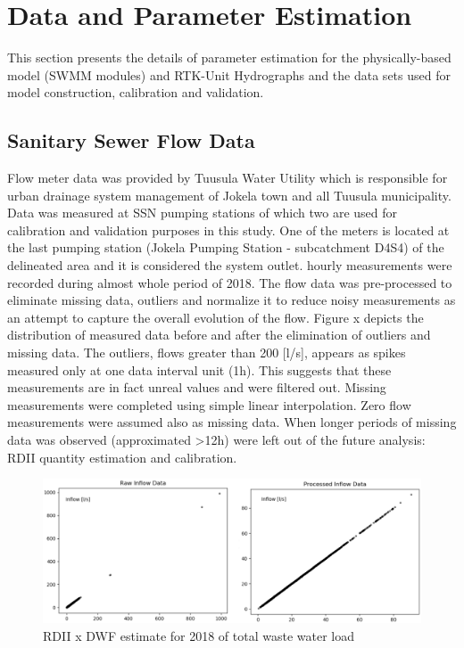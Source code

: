 \section{Data and Parameter Estimation}

This section presents the details of parameter estimation for the physically-based model (SWMM modules) and RTK-Unit Hydrographs and the data sets used for model construction, calibration and validation. 



\subsection{Sanitary Sewer Flow Data} \label{flowdata}
    
Flow meter data was provided by Tuusula Water Utility which is responsible for urban drainage system management of Jokela town and all Tuusula municipality. Data was measured at \ac{SSN} pumping stations of which two are used for calibration and validation purposes in this study. One of the meters is located at the last pumping station (Jokela Pumping Station - subcatchment D4S4) of the delineated area and it is considered the system outlet. hourly measurements were recorded during almost whole period of 2018. 
The flow data was pre-processed to eliminate missing data, outliers and normalize it to reduce noisy measurements as an attempt to capture the overall evolution of the flow. Figure x depicts the distribution of measured data before and after the elimination of outliers and missing data. The outliers, flows greater than 200 [l/s], appears as spikes measured only at one data interval unit (1h). This suggests that these measurements are in fact unreal values and were filtered out. Missing measurements were completed using simple linear interpolation. Zero flow measurements were assumed also as missing data. When longer periods of missing data was observed (approximated >12h) were left out of the future analysis: RDII quantity estimation and calibration. 

\begin{figure}[ht]
    \centering
	\includegraphics[scale=0.45]{figures/rawinflow_x_processedinflow.png}
	\caption{RDII x DWF estimate for 2018 of total waste water load}
	\label{fig:rdiixdwf}
\end{figure}

